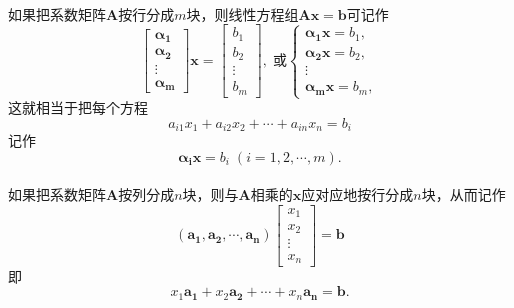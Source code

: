 \paragraph{}
如果把系数矩阵$\bm{A}$按行分成$m$块，则线性方程组$\bm{Ax}=\bm{b}$可记作
\begin{equation}
  \left[\begin{array}{c}
    \bm{\alpha_1} \\
    \bm{\alpha_2} \\
    \vdots \\
    \bm{\alpha_m}
  \end{array}\right]\bm{x} = \left[\begin{array}{c}
    b_1 \\
    b_2 \\
    \vdots \\
    b_m
  \end{array}\right], \; \text{或}
  \left\{\begin{array}{c}
    \bm{\alpha_1x} = b_1, \\
    \bm{\alpha_2x}= b_2, \\
    \vdots \\
    \bm{\alpha_mx} = b_m,
  \end{array}\right.
\end{equation}
这就相当于把每个方程
\begin{equation*}
  a_{i1}x_1 + a_{i2}x_2 + \cdots + a_{in}x_n = b_i
\end{equation*}
记作
\begin{equation*}
  \bm{\alpha_i}\bm{x}=b_i \;(i=1,2,\cdots,m).
\end{equation*}

\paragraph{}
如果把系数矩阵$\bm{A}$按列分成$n$块，则与$\bm{A}$相乘的$\bm{x}$应对应地按行分成$n$块，从而记作
\begin{equation*}
  (\bm{a_1},\bm{a_2},\cdots,\bm{a_n})\left[\begin{array}{c}
    x_1 \\
    x_2 \\
    \vdots \\
    x_n
  \end{array}\right] = \bm{b}
\end{equation*}
即
\begin{equation*}
  x_1\bm{a_1} + x_2\bm{a_2} + \cdots + x_n\bm{a_n} = \bm{b}.
\end{equation*}

